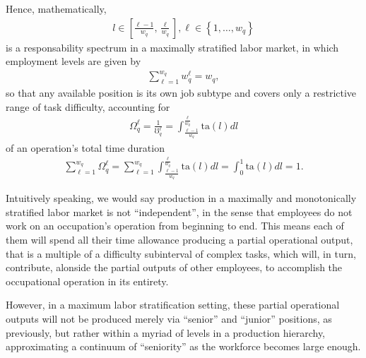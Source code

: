 \documentclass[hidelinks, nonatbib]{elsarticle}
\begin{document}
\begin{enumerate}
Hence, mathematically,
\begin{gather}
    l \in \left[
    \frac{\ell - 1}{w_q}
    ,
    \frac{\ell}{w_q}
    \right]
    ,
    \ell \in 
    \left\{
        1, \dots, w_q
    \right\}
\end{gather}
is a responsability spectrum in a maximally stratified labor market, in which employment levels are given by
\begin{gather}
    \sum_{\ell=1}^{w_q}
    w_{q}^{\ell}
    =
    w_q
    ,
\end{gather}
so that any available position is its own job subtype and covers only a restrictive range of task difficulty, accounting for
\begin{gather}
    \Omega_{q}^{\ell} = 
    \frac{1}{\mho_{q}^{\ell}} = 
    \int_{
        \frac{\ell - 1}{w_q}
    }^{
        \frac{\ell}{w_q}
    }
    \text{ta}(l)dl
\end{gather}
of an operation's total time duration
\begin{gather}
    \sum_{\ell=1}^{w_q}
    \Omega_{q}^{\ell} 
    = 
    \sum_{\ell=1}^{w_q}
    \int_{
        \frac{\ell - 1}{w_q}
    }^{
        \frac{\ell}{w_q}
    }
    \text{ta}(l)dl
    =
    \int_{0}^{1}
    \text{ta}(l)dl
    =
    1
    .
\end{gather}

Intuitively speaking, we would say production in a maximally and monotonically stratified labor market is not ``independent'', in the sense that employees do not work on an occupation's operation from beginning to end. This means each of them will spend all their time allowance producing a partial operational output, that is a multiple of a difficulty subinterval of complex tasks, which will, in turn, contribute, alonside the partial outputs of other employees, to accomplish the occupational operation in its entirety.

However, in a maximum labor stratification setting, these partial operational outputs will not be produced merely via ``senior'' and ``junior'' positions, as previously, but rather within a myriad of levels in a production hierarchy, approximating a continuum of ``seniority'' as the workforce becomes large enough.


\end{enumerate}
\end{document}

